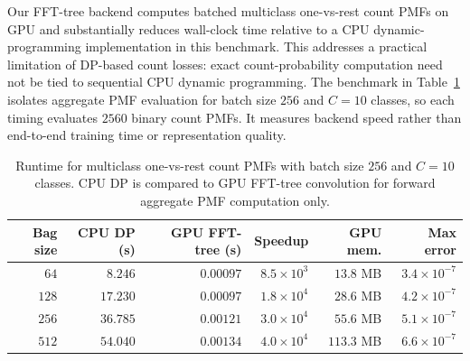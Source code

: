 Our FFT-tree backend computes batched multiclass one-vs-rest count PMFs on GPU and substantially reduces wall-clock time relative to a CPU dynamic-programming implementation in this benchmark.
This addresses a practical limitation of DP-based count losses: exact count-probability computation need not be tied to sequential CPU dynamic programming.
The benchmark in Table~\ref{tab:runtime} isolates aggregate PMF evaluation for batch size $256$ and $C=10$ classes, so each timing evaluates $2560$ binary count PMFs.
It measures backend speed rather than end-to-end training time or representation quality.

\begin{table}[t]
\centering
\caption{Runtime for multiclass one-vs-rest count PMFs with batch size $256$ and $C=10$ classes.  CPU DP is compared to GPU FFT-tree convolution for forward aggregate PMF computation only.}
\label{tab:runtime}
\begin{tabular}{rrrrrr}
\toprule
Bag size & CPU DP (s) & GPU FFT-tree (s) & Speedup & GPU mem. & Max error \\
\midrule
$64$ & $8.246$ & $0.00097$ & $8.5{\times}10^3$ & $13.8$ MB & $3.4{\times}10^{-7}$ \\
$128$ & $17.230$ & $0.00097$ & $1.8{\times}10^4$ & $28.6$ MB & $4.2{\times}10^{-7}$ \\
$256$ & $36.785$ & $0.00121$ & $3.0{\times}10^4$ & $55.6$ MB & $5.1{\times}10^{-7}$ \\
$512$ & $54.040$ & $0.00134$ & $4.0{\times}10^4$ & $113.3$ MB & $6.6{\times}10^{-7}$ \\
\bottomrule
\end{tabular}
\end{table}
